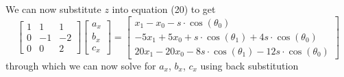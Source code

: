 \documentclass[12pt, letterpaper]{article}
\begin{document}
\newpage
We can now substitute \(z\) into equation (20) to get 
\begin{equation*}
\begin{bmatrix}
1 & 1 & 1 \\
0 & -1 & -2 \\
0 & 0 & 2
\end{bmatrix}
\begin{bmatrix}
a_x \\ b_x \\ c_x
\end{bmatrix}
= \begin{bmatrix}
x_1 - x_0 - s \cdot \cos(\theta_0) \\
-5x_1 + 5x_0  + s \cdot \cos(\theta_1) + 4s \cdot \cos(\theta_0) \\
20x_1 - 20x_0 - 8s \cdot \cos(\theta_1) -12s \cdot \cos(\theta_0)
\end{bmatrix}
\end{equation*}
through which we can now solve for \(a_x\), \(b_x\), \(c_x\) using back substitution
\end{document}
